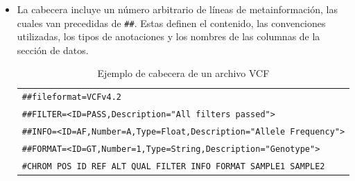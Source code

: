 \documentclass[11pt,spanish,listoffigures,listoftables]{tfgetsinf}
\begin{document}
\begin{itemize}
   \item La cabecera incluye un número arbitrario de líneas de metainformación, las cuales van precedidas de \texttt{\#\#}. Estas definen el contenido, las convenciones utilizadas, los tipos de anotaciones y los nombres de las columnas de la sección de datos\cite{DAN}.
      \begin{table}[H]
         \centering
         \caption{Ejemplo de cabecera de un archivo \ac{VCF}}
         \begin{tabular}{|l|}
         \hline
         \texttt{\#\#fileformat=\ac{VCF}v4.2} \\
         \texttt{\#\#FILTER=<ID=PASS,Description="All filters passed">} \\
         \texttt{\#\#INFO=<ID=AF,Number=A,Type=Float,Description="Allele Frequency">} \\
         \texttt{\#\#FORMAT=<ID=GT,Number=1,Type=String,Description="Genotype">} \\
         \texttt{\#CHROM POS ID REF ALT QUAL FILTER INFO FORMAT SAMPLE1 SAMPLE2} \\
         \hline
         \end{tabular}
         \label{tabla:cabeceraVCF}
      \end{table}
      

\end{itemize}
\end{document}
